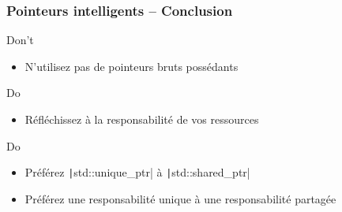\documentclass[C++.tex]{subfiles}
\begin{document}
\begin{frame}[fragile]
	\frametitle{Pointeurs intelligents -- Conclusion}
	\begin{alertblock}{Don't}
		\begin{itemize}
			\item N'utilisez pas de pointeurs bruts possédants
		\end{itemize}
	\end{alertblock}

	\begin{exampleblock}{Do}
		\begin{itemize}
			\item Réfléchissez à la responsabilité de vos ressources
		\end{itemize}
	\end{exampleblock}

	\begin{exampleblock}{Do}
		\begin{itemize}
			\item Préférez \texttt|std::unique_ptr| à \texttt|std::shared_ptr|
			\item Préférez une responsabilité unique à une responsabilité partagée

		\end{itemize}
	\end{exampleblock}
\end{frame}
\end{document}
